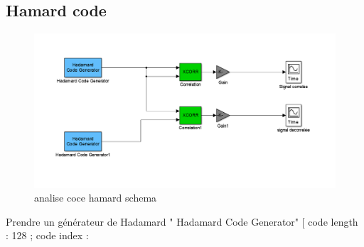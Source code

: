 \documentclass{report}
\begin{document}
%
%
%

\newpage
\subsection{Hamard code}

\begin{figure}[t]
	\centering
	\includegraphics[width=0.7\linewidth]{schema_q2_analise_code_hamard}
	\caption{analise coce hamard schema}
	\label{fig:schemaq2analisecodehamard}
\end{figure}
Prendre un générateur de Hadamard " Hadamard Code Generator" [ code length : 128 ;
code index :%
\end{document}
